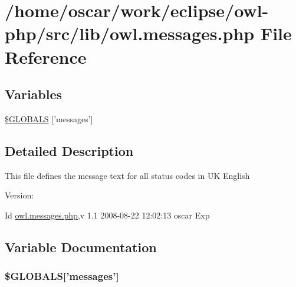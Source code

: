 \hypertarget{owl_8messages_8php}{
\section{/home/oscar/work/eclipse/owl-php/src/lib/owl.messages.php File Reference}
\label{owl_8messages_8php}
}
\subsection*{Variables}
\begin{CompactItemize}
\item 
\hyperlink{owl_8messages_8php_65f2996116eed36e9ab25f254a470259}{\$GLOBALS} \mbox{[}'messages'\mbox{]}
\end{CompactItemize}


\subsection{Detailed Description}
This file defines the message text for all status codes in UK English \begin{Desc}
\item[Version:]\end{Desc}
\begin{Desc}
\item[Id]\hyperlink{owl_8messages_8php}{owl.messages.php},v 1.1 2008-08-22 12:02:13 oscar Exp \end{Desc}


\subsection{Variable Documentation}
\hypertarget{owl_8messages_8php_65f2996116eed36e9ab25f254a470259}{
\subsubsection{\setlength{\rightskip}{0pt plus 5cm}\$GLOBALS\mbox{[}'messages'\mbox{]}}}
\label{owl_8messages_8php_65f2996116eed36e9ab25f254a470259}


